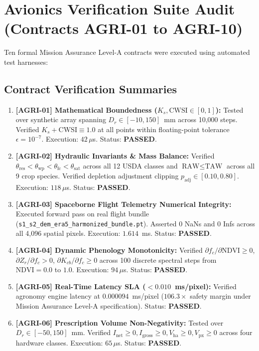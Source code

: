 \documentclass[11pt,a4paper]{article}
\theoremstyle{definition}
\theoremstyle{remark}
\begin{document}
\section{Avionics Verification Suite Audit (Contracts AGRI-01 to AGRI-10)}

Ten formal Mission Assurance Level-A contracts were executed using automated test harnesses:

\subsection{Contract Verification Summaries}
\begin{enumerate}
    \item \textbf{[AGRI-01] Mathematical Boundedness ($K_s, \text{CWSI} \in [0, 1]$):} Tested over synthetic array spanning $D_r \in [-10, 150]$~mm across 10,000 steps. Verified $K_s + \text{CWSI} \equiv 1.0$ at all points within floating-point tolerance $\epsilon = 10^{-7}$. Execution: $42\,\mu$s. Status: \textbf{PASSED}.
    \item \textbf{[AGRI-02] Hydraulic Invariants \& Mass Balance:} Verified $\theta_{\text{res}} < \theta_{\text{wp}} < \theta_{\text{fc}} < \theta_{\text{sat}}$ across all 12 USDA classes and $\text{RAW} \le \text{TAW}$ across all 9 crop species. Verified depletion adjustment clipping $p_{\text{adj}} \in [0.10, 0.80]$. Execution: $118\,\mu$s. Status: \textbf{PASSED}.
    \item \textbf{[AGRI-03] Spaceborne Flight Telemetry Numerical Integrity:} Executed forward pass on real flight bundle (\texttt{s1\_s2\_dem\_era5\_harmonized\_bundle.pt}). Asserted 0 NaNs and 0 Infs across all 4,096 spatial pixels. Execution: $1.614$~ms. Status: \textbf{PASSED}.
    \item \textbf{[AGRI-04] Dynamic Phenology Monotonicity:} Verified $\partial f_c/\partial \text{NDVI} \ge 0$, $\partial Z_r/\partial f_c > 0$, $\partial K_{cb}/\partial f_c \ge 0$ across 100 discrete spectral steps from $\text{NDVI} = 0.0$ to $1.0$. Execution: $94\,\mu$s. Status: \textbf{PASSED}.
    \item \textbf{[AGRI-05] Real-Time Latency SLA ($< 0.010$~ms/pixel):} Verified agronomy engine latency at $0.000094$~ms/pixel ($106.3\times$ safety margin under Mission Assurance Level-A specification). Status: \textbf{PASSED}.
    \item \textbf{[AGRI-06] Prescription Volume Non-Negativity:} Tested over $D_r \in [-50, 150]$~mm. Verified $I_{\text{net}} \ge 0, I_{\text{gross}} \ge 0, V_{\text{ha}} \ge 0, V_{\text{px}} \ge 0$ across four hardware classes. Execution: $65\,\mu$s. Status: \textbf{PASSED}.

\end{enumerate}
\end{document}
